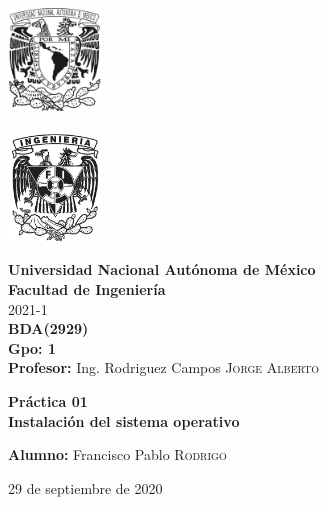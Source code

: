 \documentclass{article}
\newcommand{\materia}{BDA}
\newcommand{\clave}{2929}
\newcommand{\profesor}{Ing. Rodriguez Campos \textsc{Jorge Alberto}}
\newcommand{\semestre}{2021-1}
\newcommand{\alumno}{Francisco Pablo \textsc{Rodrigo}}
\newcommand{\actividad}{Práctica 01}
\newcommand{\titulo}{Instalación del sistema operativo}
\newcommand{\fechaEntrega}{29 de septiembre de 2020}
\begin{document}
\thispagestyle{empty}
\begin{minipage}[t][5cm][t]{0.2\linewidth}
    \includegraphics[width=2.5cm]{unam.jpg}
    \vspace{10cm}

    \includegraphics[width=2.5cm]{fiblack}
\end{minipage}
\begin{minipage}[t]{0.7\linewidth}
    \vspace{-2.5cm}
    \LARGE{\textbf{Universidad Nacional Autónoma de México}}\\
    \Large{\textbf{Facultad de Ingeniería}} \\

    \large{\semestre}\\[2cm]

    \large{\textbf{\materia (\clave)}}\\
    \large{\textbf{Gpo: 1}}\\[5mm]
    \large{\textbf{Profesor:} \profesor}\\ [1.5cm]
    \begin{center}
        \LARGE{\textbf{\actividad}}\\
        \LARGE{\textbf{\titulo}}\\
    \end{center}

    \vspace{3.3cm}

    \large{\textbf{Alumno:} \alumno} \\[1.5cm]

    \begin{flushright}
        \fechaEntrega%
    \end{flushright}
\end{minipage}

\newpage
\end{document}
